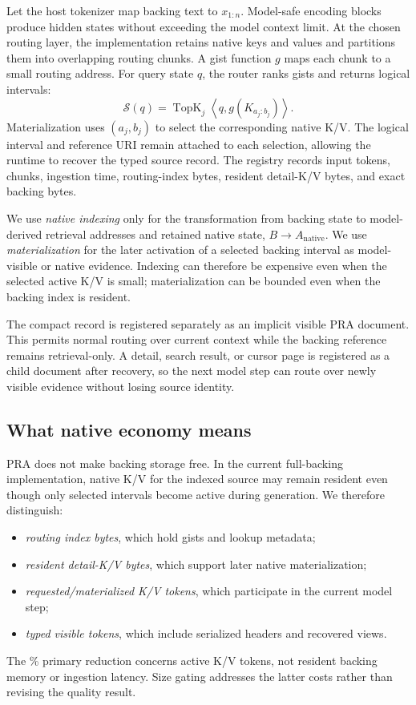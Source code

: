\documentclass[11pt]{article}
\begin{document}
Let the host tokenizer map backing text to $x_{1:n}$. Model-safe encoding blocks
produce hidden states without exceeding the model context limit. At the chosen
routing layer, the implementation retains native keys and values and partitions
them into overlapping routing chunks. A gist function $g$ maps each chunk to a
small routing address. For query state $q$, the router ranks gists and returns
logical intervals:
\begin{equation}
\mathcal{S}(q)=\operatorname{TopK}_{j}
\left\langle q,g(K_{a_j:b_j})\right\rangle .
\end{equation}
Materialization uses $(a_j,b_j)$ to select the corresponding native K/V. The
logical interval and reference URI remain attached to each selection, allowing
the runtime to recover the typed source record. The registry records input
tokens, chunks, ingestion time, routing-index bytes, resident detail-K/V bytes,
and exact backing bytes.

We use \emph{native indexing} only for the transformation from backing state to
model-derived retrieval addresses and retained native state,
$B\rightarrow A_{\mathrm{native}}$. We use \emph{materialization} for the later
activation of a selected backing interval as model-visible or native evidence.
Indexing can therefore be expensive even when the selected active K/V is small;
materialization can be bounded even when the backing index is resident.

The compact record is registered separately as an implicit visible PRA
document. This permits normal routing over current context while the backing
reference remains retrieval-only. A detail, search result, or cursor page is
registered as a child document after recovery, so the next model step can route
over newly visible evidence without losing source identity.

\subsection{What native economy means}

PRA does not make backing storage free. In the current full-backing
implementation, native K/V for the indexed source may remain resident even
though only selected intervals become active during generation. We therefore
distinguish:
\begin{itemize}[leftmargin=*]
  \item \emph{routing index bytes}, which hold gists and lookup metadata;
  \item \emph{resident detail-K/V bytes}, which support later native
  materialization;
  \item \emph{requested/materialized K/V tokens}, which participate in the
  current model step;
  \item \emph{typed visible tokens}, which include serialized headers and
  recovered views.
\end{itemize}
The \PaperSevenCalActiveKVReductionPct\% primary reduction concerns active K/V tokens, not
resident backing memory or ingestion latency. Size gating addresses the latter
costs rather than revising the quality result.
\end{document}
